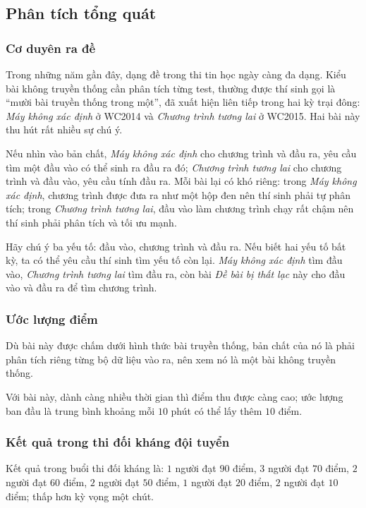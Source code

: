 \documentclass[11pt]{article}
\begin{document}
\subsection{Phân tích tổng quát}

\subsubsection{Cơ duyên ra đề}

Trong những năm gần đây, dạng đề trong thi tin học ngày càng đa dạng. Kiểu bài
không truyền thống cần phân tích từng test, thường được thí sinh gọi là ``mười
bài truyền thống trong một'', đã xuất hiện liên tiếp trong hai kỳ trại đông:
\emph{Máy không xác định} ở WC2014 và \emph{Chương trình tương lai} ở WC2015.
Hai bài này thu hút rất nhiều sự chú ý.

Nếu nhìn vào bản chất, \emph{Máy không xác định} cho chương trình và đầu ra,
yêu cầu tìm một đầu vào có thể sinh ra đầu ra đó; \emph{Chương trình tương lai}
cho chương trình và đầu vào, yêu cầu tính đầu ra. Mỗi bài lại có khó riêng:
trong \emph{Máy không xác định}, chương trình được đưa ra như một hộp đen nên
thí sinh phải tự phân tích; trong \emph{Chương trình tương lai}, đầu vào làm
chương trình chạy rất chậm nên thí sinh phải phân tích và tối ưu mạnh.

Hãy chú ý ba yếu tố: đầu vào, chương trình và đầu ra. Nếu biết hai yếu tố bất
kỳ, ta có thể yêu cầu thí sinh tìm yếu tố còn lại. \emph{Máy không xác định}
tìm đầu vào, \emph{Chương trình tương lai} tìm đầu ra, còn bài
\emph{Đề bài bị thất lạc} này cho đầu vào và đầu ra để tìm chương trình.

\subsubsection{Ước lượng điểm}

Dù bài này được chấm dưới hình thức bài truyền thống, bản chất của nó là phải
phân tích riêng từng bộ dữ liệu vào ra, nên xem nó là một bài không truyền
thống.

Với bài này, dành càng nhiều thời gian thì điểm thu được càng cao; ước lượng
ban đầu là trung bình khoảng mỗi \(10\) phút có thể lấy thêm \(10\) điểm.

\subsubsection{Kết quả trong thi đối kháng đội tuyển}

Kết quả trong buổi thi đối kháng là: \(1\) người đạt \(90\) điểm, \(3\) người
đạt \(70\) điểm, \(2\) người đạt \(60\) điểm, \(2\) người đạt \(50\) điểm,
\(1\) người đạt \(20\) điểm, \(2\) người đạt \(10\) điểm; thấp hơn kỳ vọng một
chút.
\end{document}
